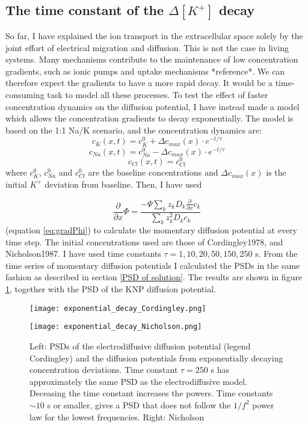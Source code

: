 \documentclass{article}
\begin{document}
\subsection{The time constant of the  $\Delta [K^+]$ decay}\label{exponential decay}
So far, I have explained the ion transport in the extracellular space solely by the joint effort of electrical migration and diffusion. This is not the case in living systems. Many mechanisms contribute to the maintenance of low concentration gradients, such as ionic pumps and uptake mechanisms *reference*. We can therefore expect the gradients to have a more rapid decay. It would be a time-consuming task to model all these processes. To test the effect of faster concentration dynamics on the diffusion potential, I have instead made a model which allows the concentration gradients to decay exponentially. The model is based on the 1:1 Na/K scenario, and the concentration dynamics are:
$$
c_{K}(x,t) = c_{K}^0 +\Delta c_{max}(x) \cdot e^{-t/\tau}
$$
$$
c_{Na}(x,t) = c_{Na}^0 -\Delta c_{max}(x) \cdot e^{-t/\tau}
$$
$$
c_{Cl}(x,t) = c_{Cl}^0
$$
where $c_{K}^0$, $c_{Na}^0$ and $c_{Cl}^0$ are the baseline concentrations and $\Delta c_{max} (x)$ is the initial $K^+$ deviation from baseline.  Then, I have used 


\begin{equation*}
\frac{\partial}{\partial x} \Phi = \frac{-\Psi \sum_k z_k D_k \frac{\partial}{\partial x} c_k}{\sum_k z_k^2 D_k c_k}
\end{equation*}
(equation \ref{eq:gradPhi}) to calculate the momentary diffusion potential at every time step. The initial concentrations used are those of Cordingley1978, and Nicholson1987. I have used time constants $\tau = 1,10,20,50, 150, 250$ s. From the time series of momentary diffusion potentials I calculated the PSDs in the same fashion as described in section \ref{PSD of solution}. The results are shown in figure \ref{fig:exponential_decay}, together with the PSD of the KNP diffusion potential. 

\begin{figure}
 
   \begin{minipage}[b]{0.45\textwidth}
    \texttt{[image: exponential\_decay\_Cordingley.png]}
  \end{minipage}
     \begin{minipage}[b]{0.45\textwidth}
    \texttt{[image: exponential\_decay\_Nicholson.png]}
  \end{minipage}
  \caption{Left: PSDs of the electrodiffusive diffusion potential (legend Cordingley) and the diffusion potentials from exponentially decaying concentration deviations. Time constant $\tau = 250$ s has approximately the same PSD as the electrodiffusive model. Deceasing the time constant increases the powers. Time constants $\sim 10$ s or smaller, gives a PSD that does not follow the $1/f^2$ power law for the lowest frequencies. Right: Nicholson}
  \label{fig:exponential_decay}
\end{figure}
\end{document}
